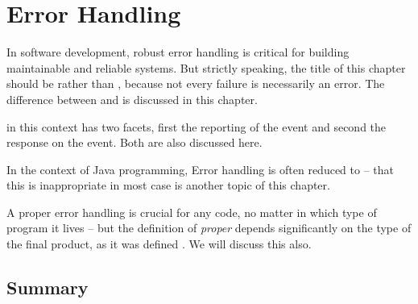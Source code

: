 \chapter{Error Handling}\label{sec:ErrorHandling}
In software development, robust error handling is critical for building maintainable and reliable systems. But strictly speaking, the title of this chapter should be  rather than , because not every failure is necessarily an error. The difference between  and  is discussed in this chapter.

 in this context has two facets, first the reporting of the event and second the response on the event. Both are also discussed here.

In the context of Java programming, Error handling is often reduced to  ­– that this is inappropriate in most case is another topic of this chapter.

A proper error handling is crucial for any code, no matter in which type of program it lives – but the definition of \textit{proper} depends significantly on the type of the final product, as it was defined . We will discuss this also.












\section{Summary}

